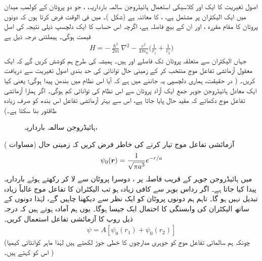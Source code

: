  اصول تغیریت کا ایک اور کلاسیکی استعمال ہائیڈروجن سالمہ بارداریہ،    ، جو  دو پروٹان کے کولمب میدان میں ایک الیکٹران پر مشتمل ہے، ،   کا معائنہ ہے  (شکل )۔  میں فی الوقت فرض کرتا ہوں کہ دونوں پروٹان کا مقام  مقررہ ،  اور ان کے بیچ فاصلہ  ہے،  اگرچہ اس حساب کا ایک دلچسپ ذیلی نتیجہ  کی اصل قیمت ہوگی۔ ہیملٹنی درجہ ذیل ہے
 \begin{align}\label{مساوات_تغیریت_ہائیڈروجن_ہیملٹنی}
H=-\frac{\hslash^{2}}{2m}\nabla^{2}-\frac{e^{2}}{4\pi\epsilon_{0}}\big(\frac{1}{r_{1}}+\frac{1}{r_{2}}\big)
\end{align}
 جہاں الیکٹران سے متعلقہ پروٹان تک فاصلے  اور  ہیں۔ ہمیشہ کی طرح ہم کوشش کریں گے کہ ایک معقول   آزمائشی  تفاعل موج  منتخب  کر کے زمینی حال توانائی کی حد بندی اصول تغیریت سے دریافت کریں۔ ( در حقیقت،  ہماری دلچسپی یہ جاننے میں ہے  کہ آیا اس نظام میں بندھن  پیدا ہوگی؛  یعنی کیا  ایک معادل ہائیڈروجن جوہر جمع ایک آزاد پروٹان سے  اس نظام کی توانائی کم ہوگی۔ اگر ہمارا آزمائشی  تفاعل موج دکھائے کہ  مقید حال پایا جاتا ہے،  اس سے  بہتر آزمائشی  تفاعل اس بندھ  کو صرف زیادہ  طاقتور بنا سکتا ہے۔)
\begin{figure} \centering
{} 
\caption{ہائیڈروجن سالمہ بارداریہ، } 
\label{شکل_تغیریت_ہائیڈروجن_سالمہ_بارداریہ} 
\end{figure} 

 آزمائشی تفاعل موج تیار کرنے کی خاطر فرض کریں کہ  زمینی حال  (مساوات )
\begin{align}
\psi_{0}({{\boldsymbol{r}}})=\frac{1}{\sqrt{\pi a^{3}}}e^{-r/a} 
\end{align}
  میں  ہائیڈروجن جوہر کے قریب  فاصلہ  پر ،   دوسرا پروٹان  سے  لا کر رکھتے ہوئے   بارداریہ پیدا کیا جاتا ہے۔ اگر رداس بوہر سے  کافی زیادہ  ہو تب الیکٹران کا تفاعل موج غالباً زیادہ تبدیل نہیں ہو گا۔ تاہم ہم دونوں پروٹان کو ایک نظر سے دیکھنا  چاہیں گے،  لہٰذا دونوں  کے ساتھ الیکٹران کی وابستگی کا احتمال ایک  جیسا ہوگا۔ یوں ہم آمادہ ہوتے ہیں  کہ  درجہ ذیل روپ کا آزمائشی تفاعل استعمال کریں۔ 
 \begin{align}\label{مساوات_تغیریت_آزمائشی_تفاعل}
\psi=A[\psi_{0}(r_{1})+\psi_{0}(r_{2})]
\end{align}
(چونکہ ہم سالماتی    تفاعل موج کو جوہری مدارچوں کا خطی جوڑ لکھتے ہیں لہٰذا ماہر کوانٹائی  کیمیا اس  کو  کہتے ہیں۔ )

